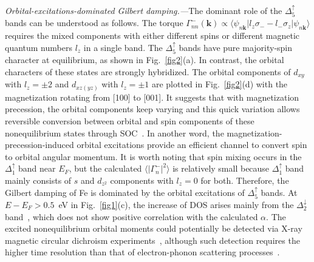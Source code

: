 \documentclass[prl,aps,twocolumn,showpacs,citeautoscript,reprint,superscriptaddress]{revtex4-1}
\begin{document}
{\it\color{red}Orbital-excitations-dominated Gilbert damping.---}The dominant role of the $\Delta_5^\uparrow$ bands can be understood as follows. The torque $\Gamma_{nn}^{-}(\mathbf k)\propto\langle\psi_{n\mathbf k}\vert l_z\sigma_--l_- \sigma_z\vert\psi_{n\mathbf k}\rangle$ requires the mixed components with either different spins or different magnetic quantum numbers $l_z$ in a single band. The $\Delta_5^\uparrow$ bands have pure majority-spin character at equilibrium, as shown in Fig.~\ref{fig2}(a). In contrast, the orbital characters of these states are strongly hybridized. The orbital components of $d_{xy}$ with $l_z=\pm2$ and $d_{xz(yz)}$ with $l_z=\pm1$ are plotted in Fig.~\ref{fig2}(d) with the magnetization rotating from [100] to [001]. It suggests that with magnetization precession, the orbital components keep varying and this quick variation allows reversible conversion between orbital and spin components of these nonequilibrium states through SOC~\cite{Ning:arxiv23}. In another word, the magnetization-precession-induced orbital excitations provide an efficient channel to convert spin to orbital angular momentum. It is worth noting that spin mixing occurs in the $\Delta_1^\uparrow$ band near $E_F$, but the calculated $\langle\vert\Gamma^-_n\vert^2\rangle$ is relatively small because $\Delta_1^\uparrow$ band mainly consists of $s$ and $d_{z^2}$ components with $l_z=0$ for both. Therefore, the Gilbert damping of Fe is dominated by the orbital excitations of $\Delta_5^\uparrow$ bands. At $E-E_F>0.5$~eV in Fig.~\ref{fig1}(c), the increase of DOS arises mainly from the $\Delta_2^\downarrow$ band~\cite{Singh:prb75,Callaway:prb77}, which does not show positive correlation with the calculated $\alpha$. The excited nonequilibrium orbital moments could potentially be detected via X-ray magnetic circular dichroism experiments~\cite{Emori:apl24}, although such detection requires the higher time resolution than that of electron-phonon scattering processes~\cite{Giustino:rmp17}.
\end{document}
